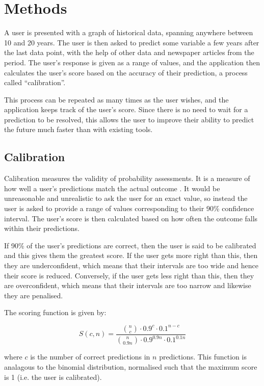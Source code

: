 \documentclass{article}
\begin{document}
\section{Methods}

A user is presented with a graph of historical data, spanning anywhere between 10 and 20 years. The user is then asked to predict some variable a few years after the last data point, with the help of other data and newspaper articles from the period. The user's response is given as a range of values, and the application then calculates the user's score based on the accuracy of their prediction, a process called ``calibration''.

This process can be repeated as many times as the user wishes, and the application keeps track of the user's score. Since there is no need to wait for a prediction to be resolved, this allows the user to improve their ability to predict the future much faster than with existing tools.

\subsection{Calibration}

Calibration measures the validity of probability assessments. It is a measure of how well a user's predictions match the actual outcome \cite{calibration}. It would be unreasonable and unrealistic to ask the user for an exact value, so instead the user is asked to provide a range of values corresponding to their 90\% confidence interval. The user's score is then calculated based on how often the outcome falls within their predictions.

If 90\% of the user's predictions are correct, then the user is said to be calibrated and this gives them the greatest score. If the user gets more right than this, then they are underconfident, which means that their intervals are too wide and hence their score is reduced. Conversely, if the user gets less right than this, then they are overconfident, which means that their intervals are too narrow and likewise they are penalised.

The scoring function is given by:

$$
S(c, n) = \dfrac{
  \binom{n}{c} \cdot 0.9^c \cdot 0.1^{n-c}
}{
  \binom{n}{0.9n} \cdot 0.9^{0.9n} \cdot 0.1^{0.1n}
}
$$

where $c$ is the number of correct predictions in $n$ predictions. This function is analagous to the binomial distribution, normalised such that the maximum score is 1 (i.e. the user is calibrated).
\end{document}

